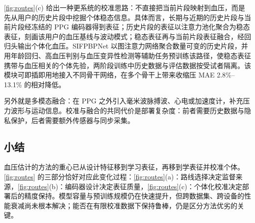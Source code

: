 \cref{fig:routes}(c) 给出一种更系统的校准思路：不直接把当前片段映射到血压，而是先从用户的历史片段中挖掘个体稳态信息。具体而言，长期与近期的历史片段与当前片段经冻结的 PPG 编码器得到表征；历史片段的表征以注意力池化聚合为稳态表征，刻画该用户的血压基线与波动模式；稳态表征再与当前片段表征融合，经回归头输出个体化血压。SIFPBPNet 以图注意力网络聚合数量可变的历史片段，并用年龄回归、高血压判别与血压变异性检测等辅助任务预训练该路径，使稳态表征携带与血压相关的个体先验，两阶段训练中历史数据与评估数据按受试者隔离\cite{tang2026sifpbpnet}。该模块可即插即用地接入不同骨干网络，在多个骨干上带来收缩压 MAE 2.8\%--13.1\% 的相对降低。

另外就是多模态融合：在 PPG 之外引入毫米波脉搏波、心电或加速度计，补充压力波形与运动信息\cite{zheng2024bp3,mieloszyk2022comparison}。校准与融合的共同代价是部署复杂度：前者需要历史数据与隐私保护，后者需要额外传感器与同步采集。

\subsection{小结}
\label{sec:techniques_summary}

血压估计的方法的重心已从设计特征移到学习表征，再移到学表征并校准个体。\cref{fig:routes} 的三部分恰好对应此变化过程：\cref{fig:routes}(a)：路线选择决定监督来源，\cref{fig:routes}(b)：编码器设计决定表征质量，\cref{fig:routes}(c)：个体化校准决定部署后的精度保持。模型容量与预训练规模仍在快速提升，但跨数据集、跨设备的性能衰减尚未根本解决；能否在有限校准数据下保持鲁棒，仍是区分方法优劣的关键。